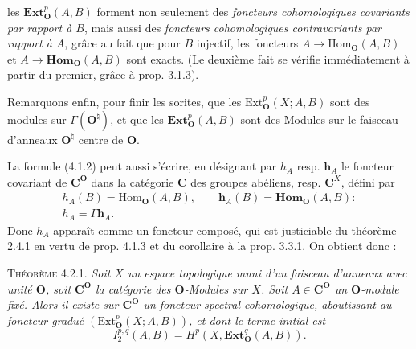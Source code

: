 \clearpage
{}

\noindent les $\mathbf{Ext}_{\mathbf O}^p(A,B)$ forment non seulement des
\textit{foncteurs cohomologiques covariants par rapport à $B$}, mais aussi des
\textit{foncteurs cohomologiques contravariants par rapport à $A$}, grâce au
fait que pour $B$ injectif, les foncteurs
$A\to\mathrm{Hom}_{\mathbf O}(A,B)$ et
$A\to\mathbf{Hom}_{\mathbf O}(A,B)$ sont exacts. (Le deuxième fait se vérifie
immédiatement à partir du premier, grâce à prop. 3.1.3).

Remarquons enfin, pour finir les sorites, que les
$\mathrm{Ext}_{\mathbf O}^p(X;A,B)$ sont des modules sur $\Gamma({\mathbf O}^\natural)$, et
que les $\mathbf{Ext}_{\mathbf O}^p(A,B)$ sont des Modules sur le faisceau d'anneaux
${\mathbf O}^\natural$ centre de ${\mathbf O}$.

La formule (4.1.2) peut aussi s'écrire, en désignant par $h_A$ resp.
$\mathbf{h}_A$ le foncteur covariant de $\mathbf C^{\mathbf O}$ dans la catégorie $\mathbf C$ des
groupes abéliens, resp. $\mathbf C^X$, défini par
\[
\tag{4.2.4}
\begin{gathered}
h_A(B)=\mathrm{Hom}_{\mathbf O}(A,B),\qquad
\mathbf{h}_A(B)=\mathbf{Hom}_{\mathbf O}(A,B):\\
h_A=\Gamma\mathbf{h}_A.
\end{gathered}
\]
Donc $h_A$ apparaît comme un foncteur composé, qui est justiciable du
théorème 2.4.1 en vertu de prop. 4.1.3 et du corollaire à la prop. 3.3.1. On
obtient donc :

\textsc{Théorème 4.2.1.} \textit{Soit $X$ un espace topologique muni
d'un faisceau d'anneaux avec unité ${\mathbf O}$, soit $\mathbf C^{\mathbf O}$ la catégorie des
${\mathbf O}$-Modules sur $X$. Soit $A\in \mathbf C^{\mathbf O}$ un ${\mathbf O}$-module fixé. Alors il existe sur
$\mathbf C^{\mathbf O}$ un foncteur spectral cohomologique, aboutissant au foncteur gradué
$(\mathrm{Ext}_{\mathbf O}^p(X;A,B))$, et dont le terme initial est}
\[
\tag{4.2.5}
I_2^{p,q}(A,B)=H^p(X,\mathbf{Ext}_{\mathbf O}^q(A,B)).
\]

